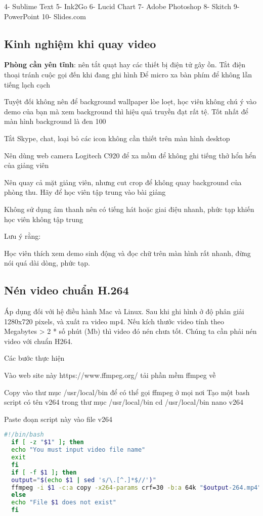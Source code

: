 4- Sublime Text
5- Ink2Go
6- Lucid Chart
7- Adobe Photoshop
8- Skitch
9- PowerPoint
10- Slides.com

\subsection{Kinh nghiệm khi quay video}

\textbf{Phòng cần yên tĩnh}: nên tắt quạt hay các thiết bị điện tử gây ồn. Tắt điện thoại tránh cuộc gọi đến khi đang ghi hình
Để micro xa bàn phím để không lẫn tiếng lạch cạch

Tuyệt đối không nên để background wallpaper lòe loẹt, học viên không chú ý vào demo của bạn mà xem background thì hiệu quả truyền đạt rất tệ. Tốt nhất để màn hình background là đen 100%

Tắt Skype, chat, loại bỏ các icon không cần thiết trên màn hình desktop

Nên dùng web camera Logitech C920 để xa mồm để không ghi tiếng thở hổn hển của giảng viên

Nên quay cả mặt giảng viên, nhưng cut crop để không quay background của phòng thu. Hãy để học viên tập trung vào bài giảng

Không sử dụng âm thanh nên có tiếng hát hoặc giai điệu nhanh, phức tạp khiến học viên không tập trung

Lưu ý rằng:

Học viên thích xem demo sinh động và đọc chữ trên màn hình rất nhanh, đừng nói quá dài dòng, phức tạp.

\subsection{Nén video chuẩn H.264}

Áp dụng đối với hệ điều hành Mac và Linux. Sau khi ghi hình ở độ phân giải 1280x720 pixels, và xuất ra video mp4. Nếu kích thước video tính theo Megabytes > 2 * số phút (Mb) thì video đó nén chưa tốt. Chúng ta cần phải nén video với chuẩn H264.

Các bước thực hiện

Vào web site này https://www.ffmpeg.org/ tải phần mềm ffmpeg về

Copy vào thư mục /usr/local/bin để có thể gọi ffmpeg ở mọi nơi
Tạo một bash script có tên v264 trong thư mục /usr/local/bin
cd /usr/local/bin
nano v264

Paste đoạn script này vào file v264

\begin{lstlisting}[language=bash]
  #!/bin/bash
  if [ -z "$1" ]; then
  echo "You must input video file name"
  exit
  fi
  if [ -f $1 ]; then
  output="$(echo $1 | sed 's/\.[^.]*$//')"
  ffmpeg -i $1 -c:a copy -x264-params crf=30 -b:a 64k "$output-264.mp4"
  else
  echo "File $1 does not exist"
  fi
\end{lstlisting}

